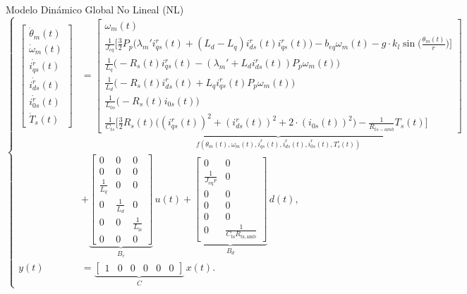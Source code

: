 \documentclass[12pt]{beamer}
\begin{document}
\begin{frame}{Modelo Dinámico Global No Lineal (NL)}
    \tiny %
    \begin{equation}
    \left\{
    \begin{aligned}
    \begin{bmatrix}
        \dot{\theta}_m(t) \\
        \dot{\omega}_m(t) \\
        \dot{i_{qs}^r}(t) \\
        \dot{i_{ds}^r}(t) \\
        \dot{i_{0s}^r}(t) \\
        \dot{T}_s(t)
    \end{bmatrix}
    &=
    \underbrace{
    \begin{bmatrix}
        \omega_m(t) \\
        \frac{1}{J_{eq}} \Big[ \frac{3}{2} P_p \big( \lambda_m' i_{qs}^r(t) + (L_d - L_q) i_{ds}^r(t) i_{qs}^r(t) \big) - b_{eq} \omega_m(t) - g \cdot k_l \sin\big(\frac{\theta_m(t)}{r}\big) \Big] \\
        \frac{1}{L_q} \Big(- R_s(t) i_{qs}^r(t) - (\lambda_m' + L_d i_{ds}^r(t)) P_p \omega_m(t) \Big) \\
        \frac{1}{L_d} \Big( - R_s(t) i_{ds}^r(t) + L_q i_{qs}^r(t) P_p \omega_m(t) \Big) \\
        \frac{1}{L_{0s}} \Big( - R_s(t) i_{0s}(t) \Big) \\
        \frac{1}{C_{ts}} \Big[ \frac{3}{2} R_s(t) \big( (i_{qs}^r(t))^2 + (i_{ds}^r(t))^2 + 2 \cdot (i_{0s}(t))^2 \big) - \frac{1}{R_{ts-amb}} T_s(t) \Big]
    \end{bmatrix}
    }_{f(\theta_m(t),\omega_m(t),i_{qs}^r(t),i_{ds}^r(t),i_{0s}^r(t),T^\circ_s(t))}
     \\ &+
    \underbrace{
    \begin{bmatrix}
    0 & 0 & 0 \\
    0 & 0 & 0 \\
    \frac{1}{L_q} & 0 & 0 \\
    0 & \frac{1}{L_d} & 0 \\
    0 & 0 & \frac{1}{L_{\mathrm{ls}}} \\
    0 & 0 & 0
    \end{bmatrix} }_{B_c}
    \, u(t)
    +
    \underbrace{\begin{bmatrix}
    0 & 0 \\
    \frac{1}{J_{\mathrm{eq}} r} & 0 \\
    0 & 0 \\
    0 & 0 \\
    0 & 0 \\
    0 & \frac{1}{C_{\mathrm{ts}} R_{\mathrm{ts},\mathrm{amb}}}
    \end{bmatrix} }_{B_d}
    \, d(t), \\
    y(t) &=
    \underbrace{\begin{bmatrix}
        1 & 0 & 0 & 0 & 0 & 0
    \end{bmatrix}}_{C}
    \, x(t).
    \end{aligned}
    \right.
    \end{equation}
\end{frame}
\end{document}
